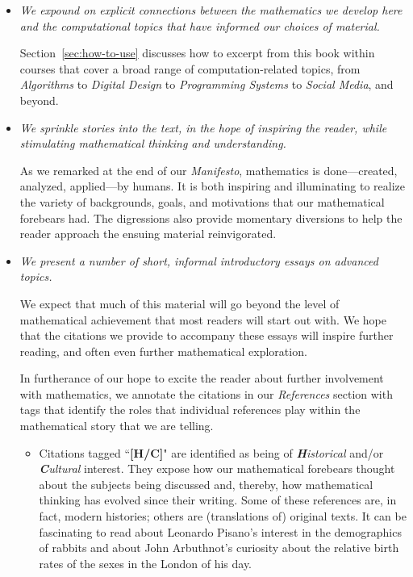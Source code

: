 \begin{itemize}
\item
{\em We expound on explicit connections between the mathematics we develop here and the computational topics that have informed our choices of material.}

\smallskip

Section~\ref{sec:how-to-use} discusses how to excerpt from this book within courses that cover a broad range of computation-related topics, from {\em Algorithms} to {\em Digital Design} to {\em Programming Systems} to {\em Social Media}, and beyond.

\medskip\item
{\em We sprinkle stories into the text, in the hope of inspiring the reader, while stimulating mathematical thinking and understanding.}

\smallskip

As we remarked at the end of our {\it Manifesto}, mathematics is done---created, analyzed, applied---by humans.  It is both inspiring and illuminating to realize the variety of backgrounds, goals, and motivations that our mathematical forebears had.  The digressions also provide momentary diversions to help the reader approach the ensuing material reinvigorated.

\medskip\item
{\em We present a number of short, informal introductory essays on advanced topics.}

\smallskip

We expect that much of this material will go beyond the level of mathematical achievement that most readers will start out with.  We hope that the citations we provide to accompany these essays will inspire further reading, and often even further mathematical exploration.

\smallskip

In furtherance of our hope to excite the reader about further involvement with mathematics, we annotate the citations in our {\it References} section with tags that identify the roles that individual references play within the mathematical story that we are telling.
  \begin{itemize}
  \item
Citations tagged ``{\bf [H/C]}" are identified as being of {\em {\bf H}istorical} and/or {\em {\bf C}ultural} interest.  They expose how our mathematical forebears thought about the subjects being discussed and, thereby, how mathematical thinking has evolved since their writing.  Some of these references are, in fact, modern histories; others are (translations of) original texts.  It can be fascinating to read about Leonardo Pisano's interest in the demographics of rabbits and about John Arbuthnot's curiosity about the relative birth rates of the sexes in the London of his day.


\end{itemize}
\end{itemize}
